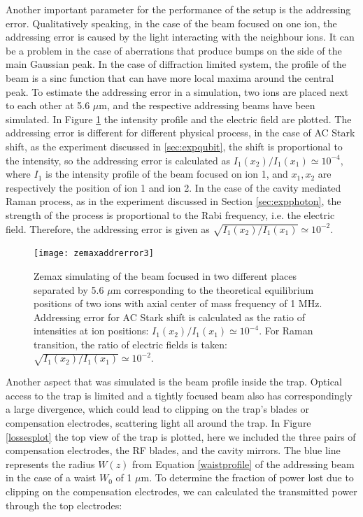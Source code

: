 Another important parameter for the performance of the setup is the addressing error. Qualitatively speaking, in the case of the beam focused on one ion, the addressing error is caused by the light interacting with the neighbour ions. It can be a problem in the case of aberrations that produce bumps on the side of the main Gaussian peak. In the case of diffraction limited system, the profile of the beam is a sinc function that can have more local maxima around the central peak. To estimate the addressing error in a simulation, two ions are placed next to each other at 5.6 $\mu$m, and the respective addressing beams have been simulated. In Figure \ref{zemaxaddrerror.png} the intensity profile and the electric field are plotted. The addressing error is different for different physical process, in the case of AC Stark shift, as the experiment discussed in \ref{sec:expqubit}, the shift is proportional to the intensity, so the addressing error is calculated as $I_1(x_2)/I_1(x_1) \simeq 10^{-4}$, where $I_{1}$ is the intensity profile of the beam focused on ion 1, and $x_1,x_2$ are respectively the position of ion 1 and ion 2. In the case of the cavity mediated Raman process, as in the experiment discussed in Section \ref{sec:expphoton}, the strength of the process is proportional to the Rabi frequency, i.e. the electric field. Therefore, the addressing error is given as $\sqrt{I_1(x_2)/I_1(x_1)} \simeq 10^{-2}$.
 \begin{figure}
 \centering
 \texttt{[image: zemaxaddrerror3]}
 \caption{Zemax simulating of the beam focused in two different places separated by 5.6 $\mu$m corresponding to the theoretical equilibrium positions of two ions with axial center of mass frequency of 1 MHz. Addressing error for AC Stark shift is calculated as the ratio of intensities at ion positions: $I_1(x_2)/I_1(x_1) \simeq 10^{-4}$. For Raman transition, the ratio of electric fields is taken: $\sqrt{I_1(x_2)/I_1(x_1)} \simeq 10^{-2}$.}
 \label{zemaxaddrerror.png}
 \end{figure}
Another aspect that was simulated is the beam profile inside the trap. Optical access to the trap is limited and a tightly focused beam also has correspondingly a large divergence, which could lead to clipping on the trap's blades or compensation electrodes, scattering light all around the trap. In Figure \ref{lossesplot} the top view of the trap is plotted, here we included the three pairs of compensation electrodes, the RF blades, and the cavity mirrors. The blue line represents the radius $W(z)$ from Equation \ref{waistprofile} of the addressing beam in the case of a waist $W_0$ of 1 $\mu$m. To determine the fraction of power lost due to clipping on the compensation electrodes, we can calculated the transmitted power through the top electrodes:
